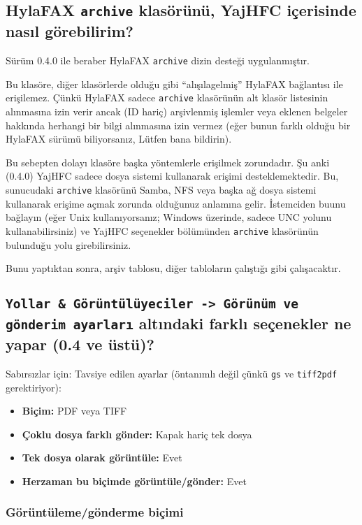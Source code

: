 \documentclass[a4paper,10pt]{scrartcl}
\begin{document}
\subsection{HylaFAX \texttt{archive} klasörünü, YajHFC içerisinde nasıl görebilirim?}

Sürüm 0.4.0 ile beraber HylaFAX \texttt{archive} dizin desteği uygulanmıştır.

Bu klasöre, diğer klasörlerde olduğu gibi "`alışılagelmiş"' HylaFAX bağlantısı ile erişilemez. Çünkü HylaFAX sadece 
\texttt{archive} klasörünün alt klasör listesinin alınmasına izin verir ancak (ID hariç) arşivlenmiş işlemler veya eklenen belgeler hakkında herhangi bir bilgi alınmasına izin vermez (eğer bunun farklı olduğu bir HylaFAX sürümü biliyorsanız, Lütfen bana bildirin).

Bu sebepten dolayı klasöre başka yöntemlerle erişilmek zorundadır. Şu anki (0.4.0) YajHFC sadece dosya sistemi kullanarak erişimi desteklemektedir. Bu, sunucudaki \texttt{archive} klasörünü Samba, NFS veya başka ağ dosya sistemi kullanarak erişime açmak zorunda olduğunuz anlamına gelir. İstemciden buunu bağlayın (eğer Unix kullanıyorsanız; Windows üzerinde, sadece UNC yolunu kullanabilirsiniz) ve YajHFC seçenekler bölümünden \texttt{archive} klasörünün bulunduğu yolu girebilirsiniz.

Bunu yaptıktan sonra, arşiv tablosu, diğer tabloların çalıştığı gibi çalışacaktır.

\subsection{\texttt{Yollar \& Görüntülüyeciler -> Görünüm ve gönderim ayarları} altındaki farklı seçenekler ne yapar (0.4 ve üstü)?}

Sabırsızlar için: Tavsiye edilen ayarlar (öntanımlı değil çünkü \texttt{gs} ve \texttt{tiff2pdf} gerektiriyor):
\begin{itemize}
 \item \textbf{Biçim:} PDF veya TIFF
 \item \textbf{Çoklu dosya farklı gönder:} Kapak hariç tek dosya
 \item \textbf{Tek dosya olarak görüntüle:} Evet
 \item \textbf{Herzaman bu biçimde görüntüle/gönder:} Evet
\end{itemize}

\subsubsection{Görüntüleme/gönderme biçimi}
\end{document}
